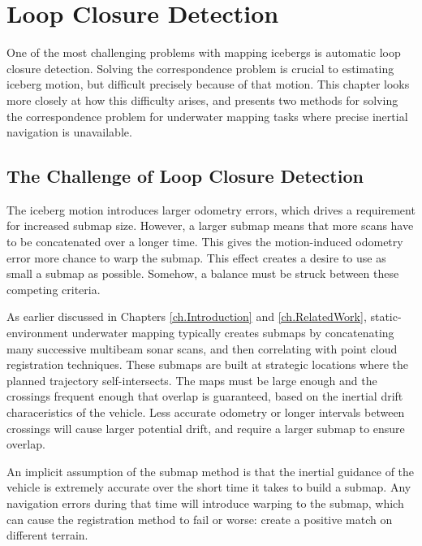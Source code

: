 
\chapter{Loop Closure Detection}
\label{ch.LoopClosure}

One of the most challenging problems with mapping icebergs is automatic loop closure detection. Solving the correspondence problem is crucial to estimating iceberg motion, but difficult precisely because of that motion. This chapter looks more closely at how this difficulty arises, and presents two methods for solving the correspondence problem for underwater mapping tasks where precise inertial navigation is unavailable.

\section{The Challenge of Loop Closure Detection}

The iceberg motion introduces larger odometry errors, which drives a requirement for increased submap size. However, a larger submap means that more scans have to be concatenated over a longer time. This gives the motion-induced odometry error more chance to warp the submap. This effect creates a desire to use as small a submap as possible. Somehow, a balance must be struck between these competing criteria. 

As earlier discussed in Chapters \ref{ch.Introduction} and \ref{ch.RelatedWork}, static-environment underwater mapping typically creates submaps by concatenating many successive multibeam sonar scans, and then correlating with point cloud registration techniques. These submaps are built at strategic locations where the planned trajectory self-intersects. The maps must be large enough and the crossings frequent enough that overlap is guaranteed, based on the inertial drift characeristics of the vehicle. Less accurate odometry or longer intervals between crossings will cause larger potential drift, and require a larger submap to ensure overlap.

An implicit assumption of the submap method is that the inertial guidance of the vehicle is extremely accurate over the short time it takes to build a submap. Any navigation errors during that time will introduce warping to the submap, which can cause the registration method to fail or worse: create a positive match on different terrain. 

